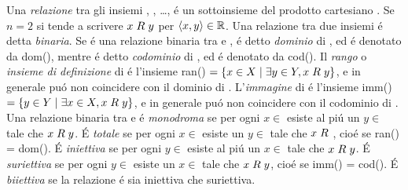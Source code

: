 Una \textit{relazione} tra gli insiemi , , \dots,  é un sottoinsieme  del prodotto cartesiano . Se $n = 2$ si tende a scrivere $x \hspace{1mm} R \hspace{1mm} y$ per $\langle x, y \rangle \in \mathbb{R}$. Una relazione tra due insiemi é detta \textit{binaria}. Se  é una relazione binaria tra  e ,  é detto \textit{dominio} di , ed é denotato da dom(), mentre  é detto \textit{codominio} di , ed é denotato da cod(). Il \textit{rango} o \textit{insieme di definizione} di  é l'insieme ran() $ = \{x \in X \hspace{1mm}|\hspace{1mm} \exists y \in Y, x \hspace{1mm} R \hspace{1mm} y\}$, e in generale puó non coincidere con il dominio di . L'\textit{immagine} di  é l'insieme imm() $= \{y \in Y \hspace{1mm}|\hspace{1mm} \exists x \in X, x \hspace{1mm} R \hspace{1mm} y\}$, e in generale puó non coincidere con il codominio di . Una relazione binaria  tra  e  é \textit{monodroma} se per ogni $x \in$  esiste al piú un $y \in$  tale che $x \hspace{1mm} R \hspace{1mm} y$. É \textit{totale} se per ogni $x \in$  esiste un $y \in$  tale che $x \hspace{1mm} R \hspace{1mm}$, cioé se ran() = dom(). É \textit{iniettiva} se per ogni $y \in$  esiste al piú un $x \in$  tale che $x \hspace{1mm} R \hspace{1mm} y$. É \textit{suriettiva} se per ogni $y \in$  esiste un $x \in$  tale che $x \hspace{1mm} R \hspace{1mm} y$, cioé se imm() = cod(). É \textit{biiettiva} se la relazione é sia iniettiva che suriettiva.
